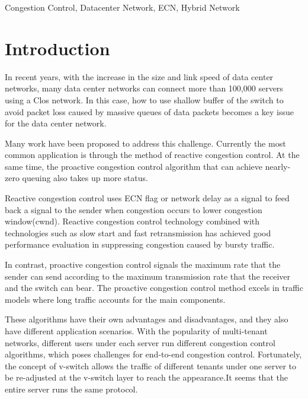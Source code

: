 \documentclass[conference]{IEEEtran}
\begin{document}
\begin{IEEEkeywords}
Congestion Control, Datacenter Network, ECN, Hybrid Network
\end{IEEEkeywords}

\section{Introduction}

In recent years, with the increase in the size and link speed of data center networks, many data center networks can connect more than 100,000 servers using a Clos network\cite{Arjun2016Jupiter}. In this case, how to use shallow buffer of the switch to avoid packet loss caused by massive queues of data packets becomes a key issue for the data center network\cite{Al2008A}\cite{GREENBERG2009VL2}.

\indent Many work have been proposed to address this challenge. Currently the most common application is through the method of reactive congestion control. At the same time, the proactive congestion control algorithm that can achieve nearly-zero queuing also takes up more status.

\indent Reactive congestion control uses ECN flag\cite{Alizadeh2010Data}\cite{Alizadeh2012Less}\cite{wu2010ictcp} \cite{zhu2015congestion}or network delay\cite{lee2015accurate}\cite{mittal2015timely}\cite{perry2015fastpass} as a signal to feed back a signal to the sender when congestion occurs to lower congestion window(cwnd). Reactive congestion control technology combined with technologies such as slow start and fast retransmission\cite{stevens1997tcp} has achieved good performance evaluation in suppressing congestion caused by bursty traffic\cite{benson2010network}\cite{Alizadeh2010Data}.

\indent In contrast, proactive congestion control signals the maximum rate that the sender can send according to the maximum transmission rate that the receiver and the switch can bear\cite{huang2018congestion}. The proactive congestion control method excels in traffic models where long traffic accounts for the main components.

\indent These algorithms have their own advantages and disadvantages, and they also have different application scenarios. With the popularity of multi-tenant networks, different users under each server run different congestion control algorithms, which poses challenges for end-to-end congestion control. Fortunately, the concept of v-switch allows the traffic of different tenants under one server to be re-adjusted at the v-switch layer to reach the appearance.It seems that the entire server runs the same protocol\cite{He2016AC}.
\end{document}
